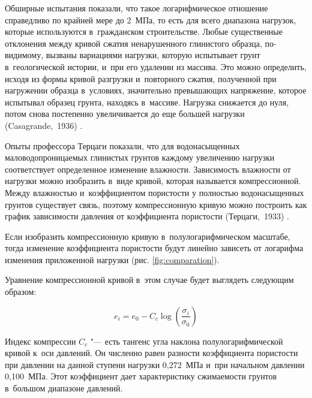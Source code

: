 Обширные испытания показали, что такое логарифмическое отношение справедливо по крайней мере до 2~МПа, то есть для всего диапазона нагрузок, которые используются в~гражданском строительстве.
Любые существенные отклонения между кривой сжатия ненарушенного глинистого образца, по-видимому, вызваны вариациями нагрузки, которую испытывает грунт в~геологической истории, и~при его удалении из массива.
Это можно определить, исходя из формы кривой разгрузки и~повторного сжатия, полученной при нагружении образца в~условиях, значительно превышающих напряжение, которое испытывал образец грунта, находясь в~массиве.
Нагрузка снижается до нуля, потом снова постепенно увеличивается до еще большей нагрузки (Casagrande,~1936) \cite{casagrande1936}.

 Опыты профессора Терцаги показали, что для водонасыщенных маловодопроницаемых глинистых грунтов каждому увеличению нагрузки соответствует определенное изменение влажности. 
 Зависимость влажности от нагрузки можно изобразить в~виде кривой,
 которая называется компрессионной. 
 Между влажностью и~коэффициентом пористости у полностью водонасыщенных грунтов существует связь, поэтому компрессионную кривую можно построить как график зависимости давления от коэффициента пористости (Терцаги,~1933) \cite{terz1933}.



 Если изобразить компрессионную кривую в~полулогарифмическом масштабе, 
 тогда изменение коэффициента пористости будут линейно зависеть от логарифма изменения приложенной нагрузки (рис. \ref{fig:comparation}).

 \begin{sidewaysfigure}[p]
  \label{fig:comparation}
  \centering
  \small
  
  \caption{Сравнение компрессионой кривой в~линейном и~логарифмическом масштабе (Casagrande, 1936) \cite{casagrande1936}}
 \end{sidewaysfigure}


 Уравнение компрессионной кривой в~этом случае будет выглядеть следующим образом:
 
 \begin{equation}
 e_i=e_0-C_c \log \left( \frac{\sigma_i}{\sigma_0} \right)
 \label{eq:ke}
 \end{equation}
 
 Индекс компрессии $C_c$ "--- есть тангенс угла наклона полулогарифмической кривой к~оси давлений. Он численно равен разности коэффициента пористости при давлении на данной ступени нагрузки 0,272~МПа и~при начальном давлении 0,100~МПа. Этот коэффициент дает характеристику сжимаемости грунтов в~большом диапазоне давлений. 
 
